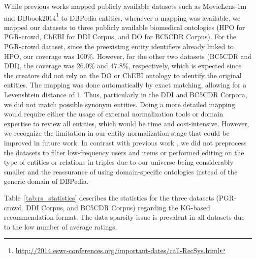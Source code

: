 While previous works \citep{10.1145/2899005,bhargava2019collaborative} mapped publicly available datasets such as MovieLens-1m \citep{10.1145/2827872} and DBbook2014\footnote{\url{http://2014.eswc-conferences.org/important-dates/call-RecSys.html}} to DBPedia \citep{lehmann2015dbpedia} entities, whenever a mapping was available, we mapped our datasets to three publicly available biomedical ontologies (HPO for PGR-crowd, ChEBI for DDI Corpus, and DO for BC5CDR Corpus). For the PGR-crowd dataset, since the preexisting entity identifiers already linked to HPO, our coverage was 100\%. However, for the other two datasets (BC5CDR and DDI), the coverage was 26.0\% and 47.8\%, respectively, which is expected since the creators did not rely on the DO or ChEBI ontology to identify the original entities. The mapping was done automatically by exact matching, allowing for a Levenshtein distance of 1. Thus, particularly in the DDI and BC5CDR Corpora, we did not match possible synonym entities. Doing a more detailed mapping would require either the usage of external normalization tools \citep{funk2014large} or domain expertise to review all entities, which would be time and cost-intensive. However, we recognize the limitation in our entity normalization stage that could be improved in future work. In contrast with previous work \citep{10.1145/3308558.3313705}, we did not preprocess the datasets to filter low-frequency users and items or performed editing on the type of entities or relations in triples due to our universe being considerably smaller and the reassurance of using domain-specific ontologies instead of the generic domain of DBPedia. 

Table~\ref{tab:rs_statistics} describes the statistics for the three datasets (PGR-crowd, DDI Corpus, and BC5CDR Corpus) regarding the KG-based recommendation format. The data sparsity issue is prevalent in all datasets due to the low number of average ratings.

